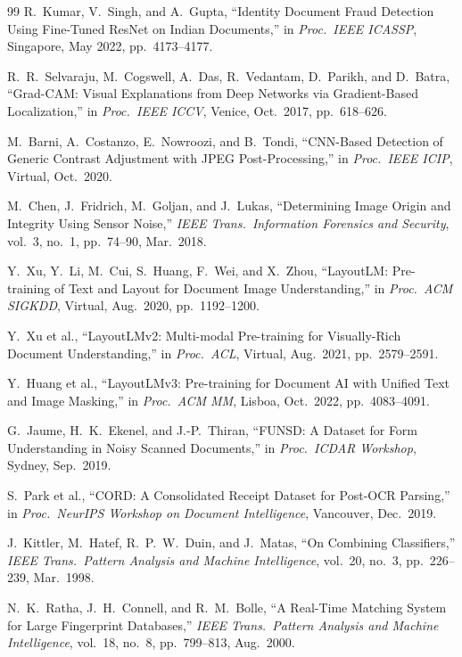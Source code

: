 \documentclass[12pt,a4paper,oneside]{report}
\begin{document}
\begin{thebibliography}{99}
R.~Kumar, V.~Singh, and A.~Gupta,
``Identity Document Fraud Detection Using Fine-Tuned ResNet on Indian Documents,''
in \textit{Proc.\ IEEE ICASSP}, Singapore, May 2022, pp.~4173--4177.

R.~R.~Selvaraju, M.~Cogswell, A.~Das, R.~Vedantam, D.~Parikh, and D.~Batra,
``Grad-CAM: Visual Explanations from Deep Networks via Gradient-Based Localization,''
in \textit{Proc.\ IEEE ICCV}, Venice, Oct.\ 2017, pp.~618--626.

M.~Barni, A.~Costanzo, E.~Nowroozi, and B.~Tondi,
``CNN-Based Detection of Generic Contrast Adjustment with JPEG Post-Processing,''
in \textit{Proc.\ IEEE ICIP}, Virtual, Oct.\ 2020.

M.~Chen, J.~Fridrich, M.~Goljan, and J.~Lukas,
``Determining Image Origin and Integrity Using Sensor Noise,''
\textit{IEEE Trans.\ Information Forensics and Security},
vol.~3, no.~1, pp.~74--90, Mar.\ 2018.

Y.~Xu, Y.~Li, M.~Cui, S.~Huang, F.~Wei, and X.~Zhou,
``LayoutLM: Pre-training of Text and Layout for Document Image Understanding,''
in \textit{Proc.\ ACM SIGKDD}, Virtual, Aug.\ 2020, pp.~1192--1200.

Y.~Xu et al.,
``LayoutLMv2: Multi-modal Pre-training for Visually-Rich Document Understanding,''
in \textit{Proc.\ ACL}, Virtual, Aug.\ 2021, pp.~2579--2591.

Y.~Huang et al.,
``LayoutLMv3: Pre-training for Document AI with Unified Text and Image Masking,''
in \textit{Proc.\ ACM MM}, Lisboa, Oct.\ 2022, pp.~4083--4091.

G.~Jaume, H.~K.~Ekenel, and J.-P.~Thiran,
``FUNSD: A Dataset for Form Understanding in Noisy Scanned Documents,''
in \textit{Proc.\ ICDAR Workshop}, Sydney, Sep.\ 2019.

S.~Park et al.,
``CORD: A Consolidated Receipt Dataset for Post-OCR Parsing,''
in \textit{Proc.\ NeurIPS Workshop on Document Intelligence},
Vancouver, Dec.\ 2019.

J.~Kittler, M.~Hatef, R.~P.~W.~Duin, and J.~Matas,
``On Combining Classifiers,''
\textit{IEEE Trans.\ Pattern Analysis and Machine Intelligence},
vol.~20, no.~3, pp.~226--239, Mar.\ 1998.

N.~K.~Ratha, J.~H.~Connell, and R.~M.~Bolle,
``A Real-Time Matching System for Large Fingerprint Databases,''
\textit{IEEE Trans.\ Pattern Analysis and Machine Intelligence},
vol.~18, no.~8, pp.~799--813, Aug.\ 2000.


\end{thebibliography}
\end{document}
